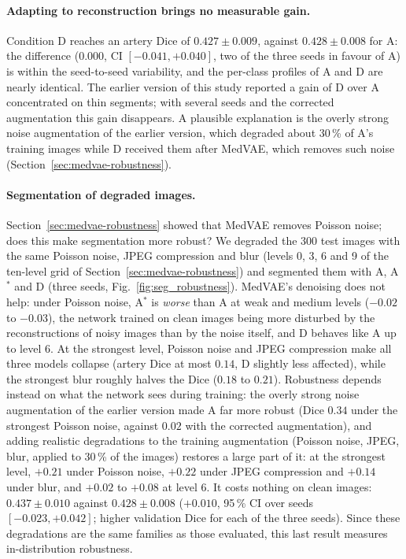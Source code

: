 \documentclass[conference]{IEEEtran}
\begin{document}
\paragraph{Adapting to reconstruction brings no measurable gain.}
Condition D reaches an artery Dice of $0.427 \pm 0.009$, against $0.428 \pm 0.008$ for A: the difference ($0.000$, CI $[-0.041, +0.040]$, two of the three seeds in favour of A) is within the seed-to-seed variability, and the per-class profiles of A and D are nearly identical. The earlier version of this study reported a gain of D over A concentrated on thin segments; with several seeds and the corrected augmentation this gain disappears. A plausible explanation is the overly strong noise augmentation of the earlier version, which degraded about 30\,\% of A's training images while D received them after MedVAE, which removes such noise (Section~\ref{sec:medvae-robustness}).

\paragraph{Segmentation of degraded images.}
Section~\ref{sec:medvae-robustness} showed that MedVAE removes Poisson noise; does this make segmentation more robust? We degraded the 300 test images with the same Poisson noise, JPEG compression and blur (levels 0, 3, 6 and 9 of the ten-level grid of Section~\ref{sec:medvae-robustness}) and segmented them with A, A$^{*}$ and D (three seeds, Fig.~\ref{fig:seg_robustness}). MedVAE's denoising does not help: under Poisson noise, A$^{*}$ is \emph{worse} than A at weak and medium levels ($-0.02$ to $-0.03$), the network trained on clean images being more disturbed by the reconstructions of noisy images than by the noise itself, and D behaves like A up to level 6. At the strongest level, Poisson noise and JPEG compression make all three models collapse (artery Dice at most $0.14$, D slightly less affected), while the strongest blur roughly halves the Dice ($0.18$ to $0.21$). Robustness depends instead on what the network sees during training: the overly strong noise augmentation of the earlier version made A far more robust (Dice $0.34$ under the strongest Poisson noise, against $0.02$ with the corrected augmentation), and adding realistic degradations to the training augmentation (Poisson noise, JPEG, blur, applied to 30\,\% of the images) restores a large part of it: at the strongest level, $+0.21$ under Poisson noise, $+0.22$ under JPEG compression and $+0.14$ under blur, and $+0.02$ to $+0.08$ at level 6. It costs nothing on clean images: $0.437 \pm 0.010$ against $0.428 \pm 0.008$ ($+0.010$, 95\,\% CI over seeds $[-0.023, +0.042]$; higher validation Dice for each of the three seeds). Since these degradations are the same families as those evaluated, this last result measures in-distribution robustness.
\end{document}

